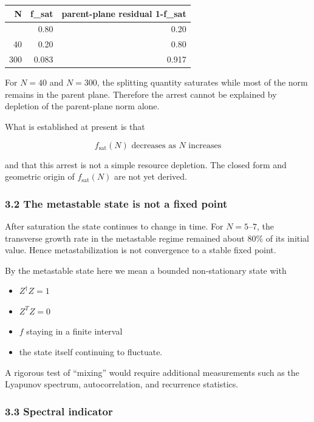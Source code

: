 \documentclass[
  a4paper,
]{article}
\newcounter{none} %
\providecommand{\tightlist}{%
  \setlength{\itemsep}{0pt}\setlength{\parskip}{0pt}}
\begin{document}
{\def\LTcaptype{none} %
\begin{longtable}[]{@{}rrr@{}}
\toprule\noalign{}
N & f\_sat & parent-plane residual 1-f\_sat \\
\midrule\noalign{}
\endhead
\bottomrule\noalign{}
\endlastfoot
5 & 0.80 & 0.20 \\
40 & 0.20 & 0.80 \\
300 & 0.083 & 0.917 \\
\end{longtable}
}

For \(N=40\) and \(N=300\), the splitting quantity saturates while most
of the norm remains in the parent plane. Therefore the arrest cannot be
explained by depletion of the parent-plane norm alone.

What is established at present is that

\[
\boxed{f_{\mathrm{sat}}(N)\text{ decreases as }N\text{ increases}}
\]

and that this arrest is not a simple resource depletion. The closed form
and geometric origin of \(f_{\mathrm{sat}}(N)\) are not yet derived.

\subsubsection{3.2 The metastable state is not a fixed
point}\label{the-metastable-state-is-not-a-fixed-point}

After saturation the state continues to change in time. For
\(N=5\)--\(7\), the transverse growth rate in the metastable regime
remained about 80\% of its initial value. Hence metastabilization is not
convergence to a stable fixed point.

By the metastable state here we mean a bounded non-stationary state with

\begin{itemize}
\tightlist
\item
  \(Z^\dagger Z=1\)
\item
  \(Z^T Z=0\)
\item
  \(f\) staying in a finite interval
\item
  the state itself continuing to fluctuate.
\end{itemize}

A rigorous test of ``mixing'' would require additional measurements such
as the Lyapunov spectrum, autocorrelation, and recurrence statistics.

\subsubsection{3.3 Spectral indicator}\label{spectral-indicator}
\end{document}
